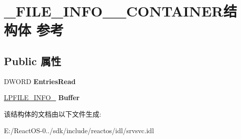 \hypertarget{struct___f_i_l_e___i_n_f_o__3___c_o_n_t_a_i_n_e_r}{}\section{\+\_\+\+F\+I\+L\+E\+\_\+\+I\+N\+F\+O\+\_\+\_\+\+C\+O\+N\+T\+A\+I\+N\+E\+R结构体 参考}
\label{struct___f_i_l_e___i_n_f_o__3___c_o_n_t_a_i_n_e_r}
\subsection*{Public 属性}
\begin{DoxyCompactItemize}
\item 
\mbox{\label{struct___f_i_l_e___i_n_f_o__3___c_o_n_t_a_i_n_e_r_ade8940b3e2e71c172754816594ef3725}} 
D\+W\+O\+RD {\bfseries Entries\+Read}
\item 
\mbox{\label{struct___f_i_l_e___i_n_f_o__3___c_o_n_t_a_i_n_e_r_afe2ffe9384c4f10ffc0fbf5f1c3d3119}} 
\hyperlink{struct___f_i_l_e___i_n_f_o__3}{L\+P\+F\+I\+L\+E\+\_\+\+I\+N\+F\+O\+\_} {\bfseries Buffer}
\end{DoxyCompactItemize}


该结构体的文档由以下文件生成\+:\begin{DoxyCompactItemize}
\item 
E\+:/\+React\+O\+S-\/0../sdk/include/reactos/idl/srvsvc.\+idl\end{DoxyCompactItemize}
